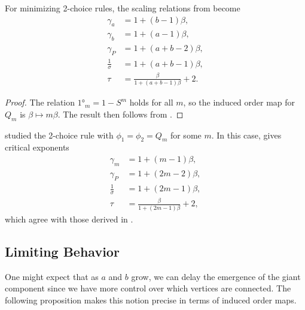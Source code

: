 \documentclass[twoside,10pt]{article}
\begin{document}
\begin{cor}
	\label{2c-minimizing-scaling-relations}
	For minimizing 2-choice rules, the scaling relations from  become
\begin{align*}
        \gamma_{a} &= 1 + (b-1)\beta,\\
        \gamma_{b} &= 1+(a-1)\beta,\\
        \gamma_{P} &= 1+(a+b-2)\beta,\\
        \frac{1}{\sigma} &= 1+(a+b-1)\beta,\\
        \tau &= \frac{\beta}{1+(a+b-1)\beta} +2.
\end{align*}
\end{cor}
\begin{proof}
	The relation $\ang{1}_{m} = 1 - S^{m}$ holds for all $m$, so the induced order map for $Q_{m}$ is $\beta \mapsto m \beta$. The result then follows from .
\end{proof}

\begin{ex}
	\cite{daCosta} studied the 2-choice rule with $\phi_1=\phi_2=Q_{m}$ for some $m$. In this case,  gives critical exponents
	\begin{align*}
		\gamma_{m} &= 1 + (m-1)\beta,\\
		\gamma_{P} &= 1 + (2m-2)\beta,\\
		\frac{1}{\sigma} &= 1 + (2m-1)\beta,\\
		\tau &= \frac{\beta}{1 + (2m-1)\beta} +2,
	\end{align*}
	which agree with those derived in \cite{daCosta}.
\end{ex}

\subsection{Limiting Behavior}

One might expect that as $a$ and $b$ grow, we can delay the emergence of the giant component since we have more control over which vertices are connected. The following proposition makes this notion precise in terms of induced order maps.
\end{document}

